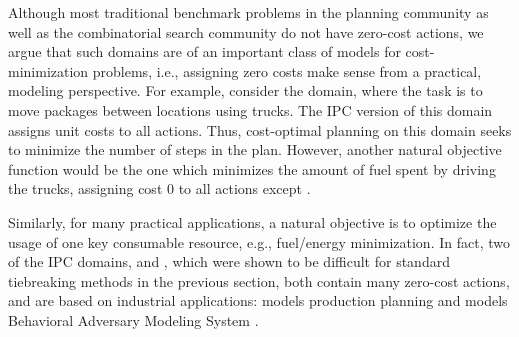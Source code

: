 
Although most traditional  benchmark problems in the planning community as well as the combinatorial search community do not have zero-cost actions,
we argue that such domains are of an important class of models for cost-minimization problems, i.e.,
assigning zero costs make sense from a practical, modeling perspective.
For example, consider the  domain, where the task is to move packages between locations using trucks.
The IPC version of this domain assigns unit costs to all actions. Thus, cost-optimal planning on this domain seeks to minimize the number of steps in the plan.
However, another natural objective function would be the one which minimizes the amount of fuel spent by driving the trucks,
assigning cost 0 to all actions except .


Similarly, for many practical applications, a natural objective is to
optimize the usage of one key consumable resource, e.g., fuel/energy
minimization.  In fact, two of the IPC domains,  and
, which were shown to be difficult for standard tiebreaking
methods in the previous section, both contain many zero-cost actions,
and are based on industrial applications: %
 models
production planning \cite{fink1999applications} and 
models Behavioral Adversary Modeling System \cite[minimizing decryption,
data transfer, etc.]{boddy2005course}.

